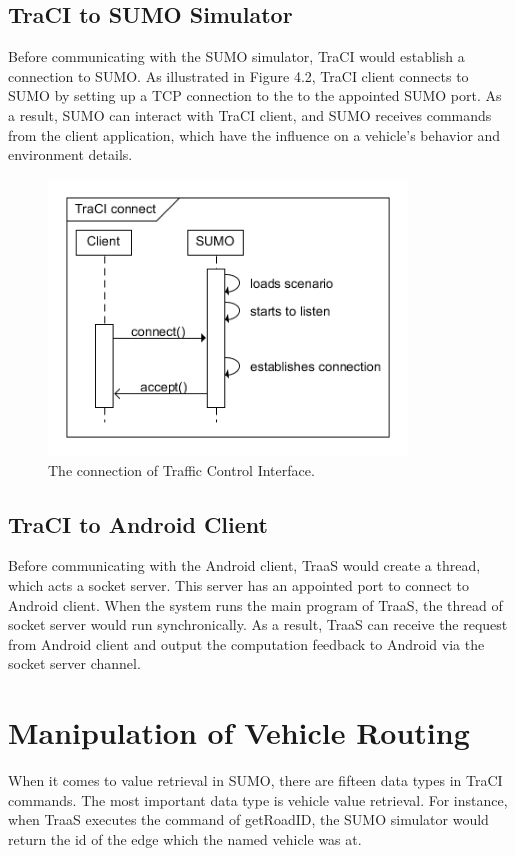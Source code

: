 \documentclass[12pt]{ksthesis}
\begin{document}
\begin{thesis}
{\subsection{TraCI to SUMO Simulator}
Before communicating with the SUMO simulator, TraCI would establish a connection to SUMO. As illustrated in Figure 4.2, TraCI client connects to SUMO by setting up a TCP connection to the to the appointed SUMO port. As a result, SUMO can interact with TraCI client, and SUMO receives commands from the client application, which have the influence on a vehicle’s behavior and environment details.

\begin{figure}[t!]
\centering
\includegraphics[width=0.85\textwidth]{./Thesis_figures/F4-2_TraCI_connection.PNG}
\caption{\large The connection of Traffic Control Interface.}
\vspace{0.5cm}
\label{Fig:TraCI_connection}
\end{figure}


\subsection{TraCI to Android Client}
Before communicating with the Android client, TraaS would create a thread, which acts a socket server. This server has an appointed port to connect to Android client. When the system runs the main program of TraaS, the thread of socket server would run synchronically. As a result, TraaS can receive the request from Android client and output the computation feedback to Android via the socket server channel.

\section{Manipulation of Vehicle Routing}
When it comes to value retrieval in SUMO, there are fifteen data types in TraCI commands. The most important data type is vehicle value retrieval. For instance, when TraaS executes the command of getRoadID, the SUMO simulator would return the id of the edge which the named vehicle was at.

}
\end{thesis}
\end{document}
